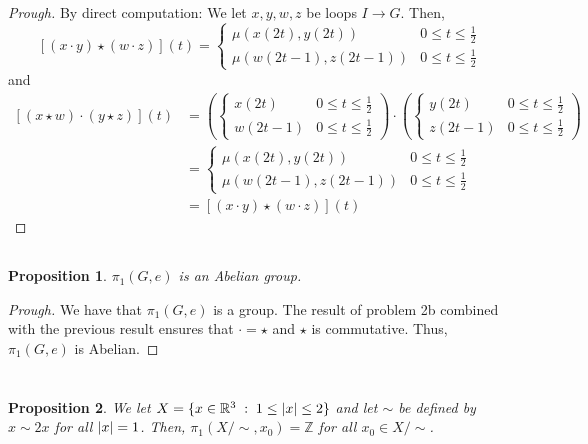 \documentclass[english]{article}
\DeclarePairedDelimiter\abs{\lvert}{\rvert}%
\newcommand{\RR}{\mathbb{R}}
\newcommand{\ZZ}{\mathbb{Z}}
\newcommand{\prob}[1]{\setcounter{section}{#1-1}\section{}}
\newcommand{\prt}[1]{\setcounter{subsection}{#1-1}\subsection{}}
\newtheorem*{proposition*}{Proposition}
\theoremstyle{remark}
\theoremstyle{definition}
\begin{document}
\begin{proof}[Prough] By direct computation:
We let $x,y,w,z$ be loops $I\to G$. Then, \begin{equation}
	\left[(x\cdot y)\star(w\cdot z)\right](t)=\begin{cases}
\mu(x(2t),y(2t))&0\leq t \leq \frac{1}{2}\\
\mu(w(2t-1),z(2t-1))&0\leq t \leq \frac{1}{2}
	\end{cases}
\end{equation}
and \begin{equation*}\begin{aligned}
\left[(x\star w)\cdot (y\star z)\right](t)&=\left(\begin{cases} x(2t)&0\leq t \leq \frac{1}{2}\\
	w(2t-1)&0\leq t \leq \frac{1}{2}\end{cases}\right)\cdot\left(\begin{cases} y(2t)&0\leq t \leq \frac{1}{2}\\
	z(2t-1)&0\leq t \leq \frac{1}{2}\end{cases}\right)\\
	&=\begin{cases}
	\mu(x(2t),y(2t))&0\leq t \leq \frac{1}{2}\\
	\mu(w(2t-1),z(2t-1))&0\leq t \leq \frac{1}{2}
	\end{cases}\\&=\left[(x\cdot y)\star(w\cdot z)\right](t)
	\end{aligned}
	\end{equation*}
\end{proof}
\prt{4}
\begin{proposition*}
	$\pi_1(G,e)$ is an Abelian group.
\end{proposition*}
\begin{proof}[Prough]
	We have that $\pi_1(G,e)$ is a group. The result of problem 2b combined with the previous result ensures that $\cdot=\star$ and $\star$ is commutative. Thus, $\pi_1(G,e)$ is Abelian.
\end{proof}
\prob{4}
\begin{proposition*}
We let $X=\{x\in \RR^3\;:\; 1\leq\abs{x}\leq 2\}$ and let $\sim$ be defined by $x\sim 2x$ for all $\abs{x}=1$. Then, $\pi_1(X/\sim,x_0)=\ZZ$ for all $x_0\in X/\sim$.
\end{proposition*}
\end{document}
